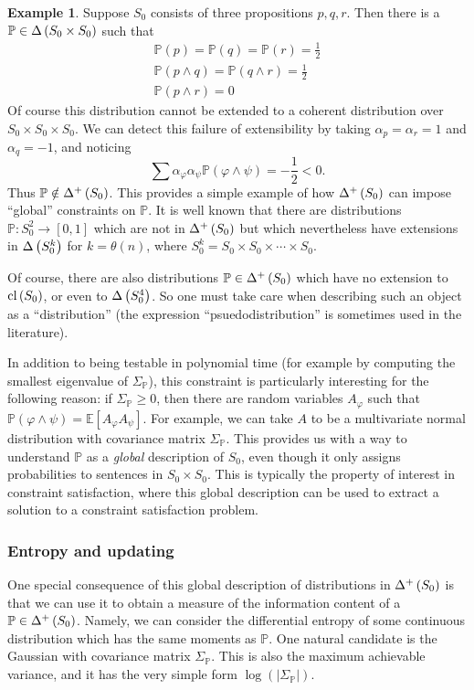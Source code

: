 \documentclass[12pt]{article}
\theoremstyle{definition}
\newtheorem{example}{Example}
\newcommand{\of}[1]{\left(#1\right)}
\newcommand{\PP}{\mathbb{P}}
\renewcommand{\P}[1]{\mathbb{P}\of{#1}}
\newcommand{\E}[1]{\mathbb{E}\left[#1\right]}
\newcommand{\vp}{\varphi}
\newcommand{\abs}[1]{\left\vert#1\right\vert}
\begin{document}
\begin{example}
Suppose $S_0$ consists of three propositions $p, q, r$.
Then there is a $\PP \in \D{S_0 \times S_0}$
such that
\begin{gather*}
\P{p} = \P{q} = \P{r} = \frac 12 \\
\P{p \wedge q} = \P{q \wedge r} = \frac 12 \\
\P{p \wedge r} = 0
\end{gather*}
Of course this distribution cannot be extended to a coherent distribution over $S_0 \times S_0 \times S_0$.
We can detect this failure of extensibility by taking $\alpha_{p} = \alpha_r = 1$ and $\alpha_q = -1$,
and noticing
\[ \sum \alpha_{\vp} \alpha_{\psi} \P{\vp \wedge \psi} = -\frac 12 < 0. \]
Thus $\PP \notin \Dp{S_0}$.
This provides a simple example of how $\Dp{S_0}$
can impose ``global'' constraints on $\PP$.
It is well known that there are distributions $\PP : S_0^2 \rightarrow [0, 1]$ which are not in $\Dp{S_0}$
but which nevertheless have extensions in $\D{S_0^k}$ for $k = \theta\of{n}$, where $S_0^k = S_0 \times S_0 \times \cdots \times S_0$.

Of course, there are also distributions $\PP \in \Dp{S_0}$ which have no extension to $\clS$,
or even to $\D{S_0^4}$.
So one must take care when describing such an object as a ``distribution''
(the expression ``psuedodistribution'' is sometimes used in the literature). %
\end{example}

\newcommand{\SP}{\Sigma_{\PP}}
In addition to being testable in polynomial time (for example
by computing the smallest eigenvalue of $\Sigma_{\PP}$),
this constraint is particularly interesting for the following reason:
if $\Sigma_{\PP} \geq 0$,
then there are random variables $A_{\vp}$ such that $\P{\vp \wedge \psi} = \E{A_{\vp} A_{\psi}}$.
For example, we can take $A$ to be a multivariate normal distribution with covariance
matrix $\SP$.
This provides us with a way to understand $\PP$ as a \emph{global} description
of $S_0$, even though it only assigns probabilities to sentences in $S_0 \times S_0$.
This is typically the property of interest in constraint satisfaction,
where this global description can be used to extract a solution to a constraint
satisfaction problem.

\subsubsection{Entropy and updating}

One special consequence of this global description of distributions in $\Dp{S_0}$
is that we can use it to obtain a measure of the information content of a $\PP \in \Dp{S_0}$.
Namely, we can consider the differential entropy of some continuous distribution which has the same
moments as $\PP$.
One natural candidate is the Gaussian with covariance matrix $\SP$. This is also
the maximum achievable variance,
and it has the very simple form $\log\of{\abs{\SP}}$.
\end{document}
